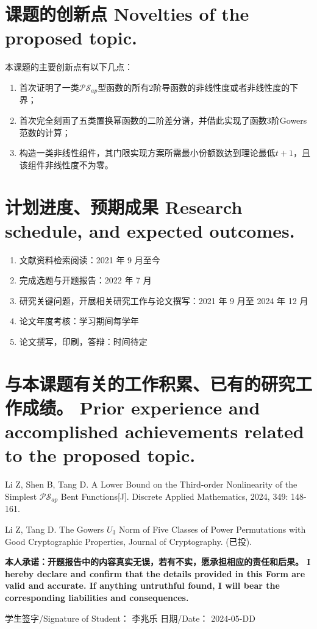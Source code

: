 \documentclass[a4paper,zihao=-4,AutoFakeBold]{ctexart}
\begin{document}
\section{课题的创新点 Novelties of the proposed topic.}
本课题的主要创新点有以下几点：
\begin{enumerate}[label=(\arabic{*})]
    \item 首次证明了一类$\mathcal{PS}_{ap}$型函数的所有$2$阶导函数的非线性度或者非线性度的下界；
    \item 首次完全刻画了五类置换幂函数的二阶差分谱，并借此实现了函数3阶Gowers范数的计算；
    \item 构造一类非线性组件，其门限实现方案所需最小份额数达到理论最低$t+1$，且该组件非线性度不为零。
\end{enumerate}

\section{计划进度、预期成果 Research schedule, and expected outcomes.}
\begin{enumerate}[label=\arabic{*})]
    \item 文献资料检索阅读：2021 年 9 月至今
    \item 完成选题与开题报告：2022 年 7 月
    \item 研究关键问题，开展相关研究工作与论文撰写：2021 年 9 月至 2024 年 12 月
    \item 论文年度考核：学习期间每学年
    \item 论文撰写，印刷，答辩：时间待定
\end{enumerate}


\section{与本课题有关的工作积累、已有的研究工作成绩。
  Prior experience and accomplished achievements
  related to the proposed topic.}
\begin{enumerate}[label={[\arabic{*}]}]
    \item Li Z, Shen B, Tang D. A Lower Bound on the Third-order Nonlinearity of the Simplest $\mathcal{PS}_{ap}$ Bent Functions[J]. Discrete Applied Mathematics, 2024, 349: 148-161.
    \item Li Z, Tang D. The Gowers $U_3$ Norm of Five Classes of Power Permutations with Good Cryptographic Properties, Journal of Cryptography. (已投). 
\end{enumerate}



\vspace{\baselineskip}

\bfseries\fangsong
\noindent
本人承诺：开题报告中的内容真实无误，若有不实，愿承担相应的责任和后果。
I hereby declare and confirm that the details
provided in this Form are valid and accurate.
If anything untruthful found,
I will bear the corresponding liabilities and consequences.

\vspace{\baselineskip}

\noindent
学生签字/Signature of Student： 李兆乐
\hfill
日期/Date： 2024-05-DD
\end{document}
